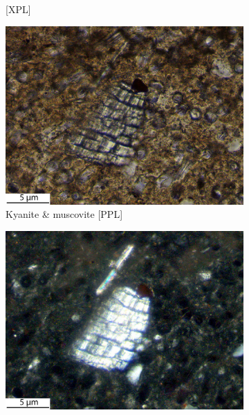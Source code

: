 \documentclass[a4paper]{article}
\begin{document}
\begin{figure}[H]
\begin{subfigure}[t]{.49\textwidth}
		\caption{[XPL]}
	\end{subfigure}
	\begin{subfigure}[t]{.24\textwidth}
		\includegraphics[width=\textwidth]{ThinSections/4-2_40x_PPL.jpg}
		\caption{Kyanite \& muscovite [PPL]}
	\end{subfigure}\hspace{.1em}\hfill
	\begin{subfigure}[t]{.24\textwidth}
		\includegraphics[width=\textwidth]{ThinSections/4-2_40x_XPL.jpg}

\end{subfigure}
\end{figure}
\end{document}

